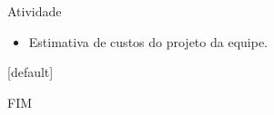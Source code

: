 \documentclass{beamer}
\begin{document}
\begin{frame}{Atividade}
    \begin{itemize}
        \justifying
        \item Estimativa de custos do projeto da equipe.
    \end{itemize}
\end{frame}

[default]



\begin{frame}
    \centering
    \Large
    FIM
\end{frame}
    
\end{document}

